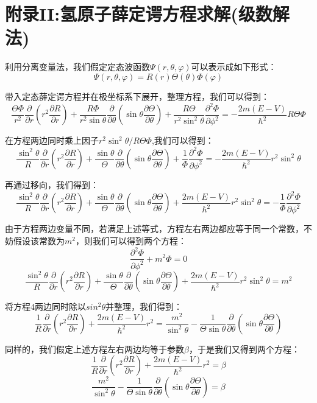 \section{附录II:氢原子薛定谔方程求解(级数解法)\label{hydrgen}}
利用分离变量法，我们假定定态波函数$\varPsi(r,\theta,\varphi)$可以表示成如下形式：
\[\varPsi(r,\theta,\varphi)=R(r)\Theta(\theta)\varPhi(\varphi)\]

带入定态薛定谔方程并在极坐标系下展开，整理方程，我们可以得到：
\[\frac{\Theta\varPhi}{r^2}\frac{\partial}{\partial{r}}(r^2\frac{\partial R}{\partial{r}})+\frac{R\varPhi}{r^2\sin\theta}\frac{\partial}{\partial{\theta}}(\sin\theta\frac{\partial \Theta}{\partial{\theta}})+\frac{R\Theta}{r^2\sin^2 \theta }\frac{\partial^2 \varPhi}{\partial{\phi^2}}=-\frac{2m(E-V)}{\hbar^2}R\Theta\varPhi\]

在方程两边同时乘上因子$r^2\sin^2 \theta/R\Theta\varPhi$,我们可以得到：
\[\frac{\sin^2 \theta}{R}\frac{\partial}{\partial{r}}(r^2\frac{\partial R}{\partial{r}})+\frac{\sin\theta}{\Theta}\frac{\partial}{\partial{\theta}}(\sin\theta\frac{\partial \Theta}{\partial{\theta}})+\frac{1}{\varPhi}\frac{\partial^2 \varPhi}{\partial{\phi^2}}=-\frac{2m(E-V)}{\hbar^2}r^2\sin^2 \theta\]

再通过移向，我们得到：
\[\frac{\sin^2 \theta}{R}\frac{\partial}{\partial{r}}(r^2\frac{\partial R}{\partial{r}})+\frac{\sin\theta}{\Theta}\frac{\partial}{\partial{\theta}}(\sin\theta\frac{\partial \Theta}{\partial{\theta}})+\frac{2m(E-V)}{\hbar^2}r^2\sin^2 \theta=-\frac{1}{\varPhi}\frac{\partial^2 \varPhi}{\partial{\phi^2}}\]

由于方程两边变量不同，若满足上述等式，方程左右两边都应等于同一个常数，不妨假设该常数为$m^2$，则我们可以得到两个方程：
\[\frac{\partial^2 \varPhi}{\partial{\phi^2}}+m^2\varPhi=0 \tag{a}\]
\[\frac{\sin^2 \theta}{R}\frac{\partial}{\partial{r}}(r^2\frac{\partial R}{\partial{r}})+\frac{\sin\theta}{\Theta}\frac{\partial}{\partial{\theta}}(\sin\theta\frac{\partial \Theta}{\partial{\theta}})+\frac{2m(E-V)}{\hbar^2}r^2\sin^2 \theta=m^2 \tag{4}\]

将方程$4$两边同时除以$sin^2 \theta$并整理，我们得到：
\[\frac{1}{R}\frac{\partial}{\partial{r}}(r^2\frac{\partial R}{\partial{r}})+\frac{2m(E-V)}{\hbar^2}r^2=\frac{m^2}{\sin^2 \theta}-\frac{1}{\Theta \sin\theta}\frac{\partial}{\partial{\theta}}(\sin\theta\frac{\partial \Theta}{\partial{\theta}})\]

同样的，我们假定上述方程左右两边均等于参数$\beta$，于是我们又得到两个方程：
\[\frac{1}{R}\frac{\partial}{\partial{r}}(r^2\frac{\partial R}{\partial{r}})+\frac{2m(E-V)}{\hbar^2}r^2=\beta \tag{b}\]
\[\frac{m^2}{\sin^2 \theta}-\frac{1}{\Theta \sin\theta}\frac{\partial}{\partial{\theta}}(\sin\theta\frac{\partial \Theta}{\partial{\theta}})=\beta \tag{c}\]

